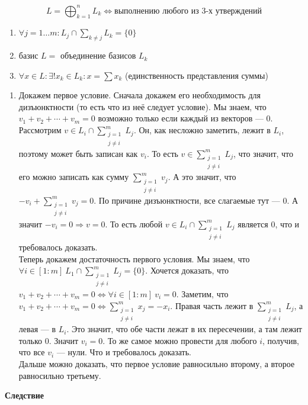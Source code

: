 \[
    L = \bigoplus_{k = 1}^{n} L_k \Leftrightarrow \text{выполнению любого из 3-х утверждений}
\]

\begin{enumerate}
    \item \(\forall j = 1 \ldots m: L_j \cap \sum\limits_{k \neq j} L_k = \{0\}\)

    \item базис \(L = \) объединение базисов \(L_k\)

    \item \(\forall x \in L: \exists! x_k \in L_k: x = \sum\limits x_k\) (единственность представления суммы)
\end{enumerate}

\begin{enumerate}
    \item[]\prooff{}
    Докажем первое условие. Сначала докажем его необходимость для дизъюнктности (то есть что из неё следует условие). Мы знаем, что $v_1+v_2+\cdots+v_m=0$ возможно только если каждый из векторов --- $0$. Рассмотрим $v\in L_i\cap\sum\limits_{\substack{j=1\\j\neq i}}^mL_j$. Он, как несложно заметить, лежит в $L_i$, поэтому может быть записан как $v_i$. То есть $v\in\sum\limits_{\substack{j=1\\j\neq i}}^mL_j$, что значит, что его можно записать как сумму $\sum\limits_{\substack{j=1\\j\neq i}}^mv_j$. А это значит, что $-v_i+\sum\limits_{\substack{j=1\\j\neq i}}^mv_j=0$. По причине дизъюнктности, все слагаемые тут --- $0$. А значит $-v_i=0\Rightarrow v=0$. То есть любой $v\in L_i\cap\sum\limits_{\substack{j=1\\j\neq i}}^mL_j$ является $0$, что и требовалось доказать.\\
    
            Теперь докажем достаточность первого условия. Мы знаем, что $\forall i\in[1:m]~L_1\cap\sum\limits_{\substack{j=1\\j\neq i}}^mL_j=\{0\}$. Хочется доказать, что $v_1+v_2+\cdots+v_m=0\Leftrightarrow\forall i\in[1:m]~v_i=0$. Заметим, что $v_1+v_2+\cdots+v_m=0\Leftrightarrow\sum\limits_{\substack{j=1\\j\neq i}}^mx_j=-x_i$. Правая часть лежит в $\sum\limits_{\substack{j=1\\j\neq i}}^mL_j$, а левая --- в $L_i$. Это значит, что обе части лежат в их пересечении, а там лежит только $0$. Значит $v_i=0$. То же самое можно провести для любого $i$, получив, что все $v_i$ --- нули. Что и требовалось доказать.\\

           Дальше можно доказать, что первое условие равносильно второму, а второе равносильно третьему.
\end{enumerate}
\textbf{Следствие}

